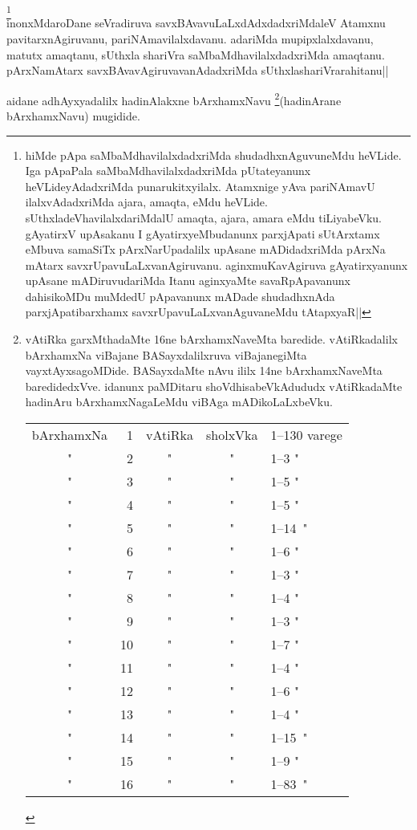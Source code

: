 \begin{artha} 
\footnote[1]{hiMde pApa saMbaMdhavilalxdadxriMda shudadhxnAguvuneMdu 
heVLide. Iga pApaPala saMbaMdhavilalxdadxriMda pUtateyanunx 
heVLideyAdadxriMda punarukitxyilalx. Atamxnige yAva pariNAmavU 
ilalxvAdadxriMda ajara, amaqta, eMdu heVLide. 
sUthxladeVhavilalxdariMdalU amaqta, ajara, amara eMdu tiLiyabeVku. 
gAyatirxV upAsakanu I gAyatirxyeMbudanunx parxjApati sUtArxtamx eMbuva 
samaSiTx pArxNarUpadalilx upAsane mADidadxriMda pArxNa mAtarx 
savxrUpavuLaLxvanAgiruvanu. aginxmuKavAgiruva gAyatirxyanunx upAsane 
mADiruvudariMda Itanu aginxyaMte savaRpApavanunx dahisikoMDu muMdedU 
pApavanunx mADade shudadhxnAda parxjApatibarxhamx 
savxrUpavuLaLxvanAguvaneMdu tAtapxyaR||}\\
inonxMdaroDane seVradiruva savxBAvavuLaLxdAdxdadxriMdaleV Atamxnu 
pavitarxnAgiruvanu, pariNAmavilalxdavanu. adariMda mupipxlalxdavanu, 
matutx amaqtanu, sUthxla shariVra saMbaMdhavilalxdadxriMda amaqtanu. 
pArxNamAtarx savxBAvavAgiruvavanAdadxriMda sUthxlashariVrarahitanu||
\end{artha}

aidane adhAyxyadalilx hadinAlakxne bArxhamxNavu 
\footnote[2]{vAtiRka garxMthadaMte 16ne bArxhamxNaveMta baredide. 
vAtiRkadalilx bArxhamxNa viBajane BASayxdalilxruva viBajanegiMta 
vayxtAyxsagoMDide. BASayxdaMte nAvu ililx 14ne bArxhamxNaveMta 
baredidedxVve. idanunx paMDitaru shoVdhisabeVkAdududx vAtiRkadaMte 
hadinAru bArxhamxNagaLeMdu viBAga mADikoLaLxbeVku.\\ 
\begin{tabular}{crccl}bArxhamxNa & 1 & vAtiRka & sholxVka & 1--130 
varege\\
" & 2 & " & " & 1--3 \qquad "\\
" & 3 & " & " & 1--5 \qquad "\\ 
" & 4 & " & " & 1--5 \qquad "\\
" & 5 & " & " & 1--14 \quad \,"\\ 
" & 6 & " & " & 1--6 \qquad "\\
" & 7 & " & " & 1--3 \qquad "\\
" & 8 & " & " & 1--4 \qquad "\\
" & 9 & " & " & 1--3 \qquad "\\
" & 10 & " & " & 1--7 \qquad "\\
" & 11 & " & " & 1--4 \qquad "\\
" & 12 & " & " & 1--6 \qquad "\\
" & 13 & " & " & 1--4 \qquad "\\
" & 14 & " & " & 1--15 \quad \,"\\
" & 15 & " & " & 1--9 \qquad "\\
" & 16 & " & " & 1--83 \quad \,"\end{tabular}}(hadinArane bArxhamxNavu) mugidide.

